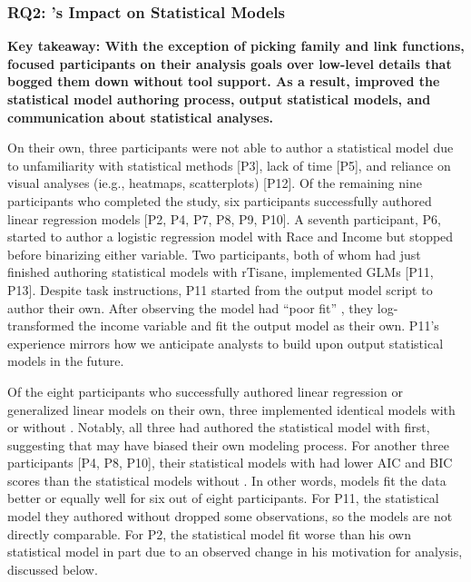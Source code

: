 
\subsubsection{RQ2: \rTisane's Impact on Statistical Models}
\textbf{Key takeaway: With the exception of picking family and link functions,
\rTisane focused participants on their analysis goals over low-level details
that bogged them down without tool support. As a result, \rTisane improved the
statistical model authoring process, output statistical models, and
communication about statistical analyses.
}

On their own, three participants were not able to author a statistical model due
to unfamiliarity with statistical methods [P3], lack of time [P5], and reliance
on visual analyses (ie.g., heatmaps, scatterplots) [P12]. Of the remaining nine
participants who completed the study, six participants successfully authored linear regression models
[P2, P4, P7, P8, P9, P10]. A seventh participant, P6, started to author a
logistic regression model with Race and Income but stopped before binarizing
either variable. Two participants, both of whom had just finished authoring
statistical models with rTisane, implemented GLMs [P11, P13]. Despite task
instructions, P11 started from the \rTisane output model script to author
their own. After observing the model had ``poor fit'' , they
log-transformed the income variable and fit the \rTisane output model as their
own. P11's experience mirrors how we anticipate analysts to build upon \rTisane
output statistical models in the future. 

Of the eight participants who successfully authored linear regression or
generalized linear models on their own, three implemented identical models with
or without \rTisane [P7, P9, P13]. Notably, all three had authored the
statistical model with \rTisane first, suggesting that \rTisane may have biased
their own modeling process. For another three participants [P4, P8, P10], their
statistical models with \rTisane had lower AIC and BIC scores than the
statistical models without \rTisane. In other words, \rTisane models fit the data
better or equally well for six out of eight participants. For P11, the
statistical model they authored without \rTisane dropped some observations, so
the models are not directly comparable. For P2, the \rTisane statistical model fit
worse than his own statistical model in part due to an observed change in his
motivation for analysis, discussed below. 

